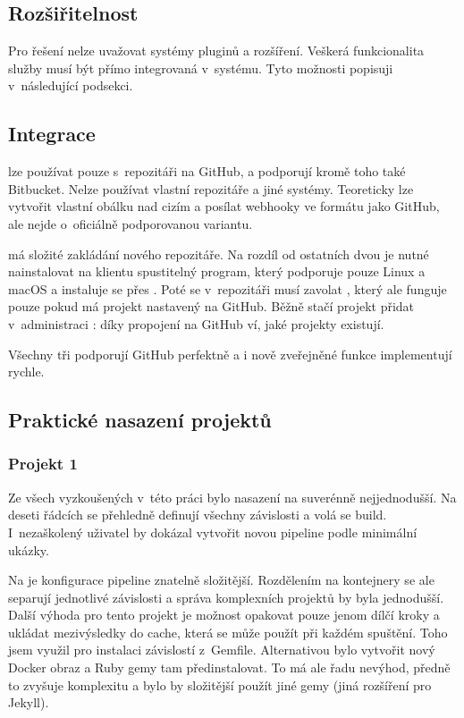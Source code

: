     \subsection{Rozšiřitelnost}
        Pro  řešení nelze uvažovat systémy pluginů a rozšíření. Veškerá funkcionalita služby musí být přímo integrovaná v~systému. Tyto možnosti popisuji v~následující podsekci.

    \subsection{Integrace}
        \travis lze používat pouze s~repozitáři na GitHub, \circleci a \semaphore podporují kromě toho také Bitbucket. Nelze používat vlastní repozitáře a jiné systémy. Teoreticky lze vytvořit vlastní obálku nad cizím  a posílat webhooky ve formátu jako GitHub, ale nejde o~oficiálně podporovanou variantu.

        \semaphore má složité zakládání nového repozitáře. Na rozdíl od ostatních dvou \CI je nutné nainstalovat na klientu spustitelný program, který podporuje pouze Linux a macOS a instaluje se přes . Poté se v~repozitáři musí zavolat , který ale funguje pouze pokud má projekt nastavený  na GitHub. Běžně stačí projekt přidat v~administraci \CI: díky propojení na GitHub \CI ví, jaké projekty existují.

        Všechny tři \CI podporují GitHub perfektně a i nově zveřejněné funkce implementují rychle.

    \subsection{Praktické nasazení projektů}
        \subsubsection{Projekt 1}
            Ze všech \CI vyzkoušených v~této práci bylo nasazení na \travis suverénně nejjednodušší. Na deseti řádcích se přehledně definují všechny závislosti a volá se build. I~nezaškolený uživatel by dokázal vytvořit novou pipeline podle minimální ukázky.

            Na \circleci je konfigurace pipeline znatelně složitější. Rozdělením na kontejnery se ale separují jednotlivé závislosti a správa komplexních projektů by byla jednodušší. Další výhoda \circleci pro tento projekt je možnost opakovat pouze jenom dílčí kroky a ukládat mezivýsledky do cache, která se může použít při každém spuštění. Toho jsem využil pro instalaci závislostí z~Gemfile. Alternativou bylo vytvořit nový Docker obraz a Ruby gemy tam předinstalovat. To má ale řadu nevýhod, předně to zvyšuje komplexitu a bylo by složitější použít jiné gemy (jiná rozšíření pro Jekyll).

